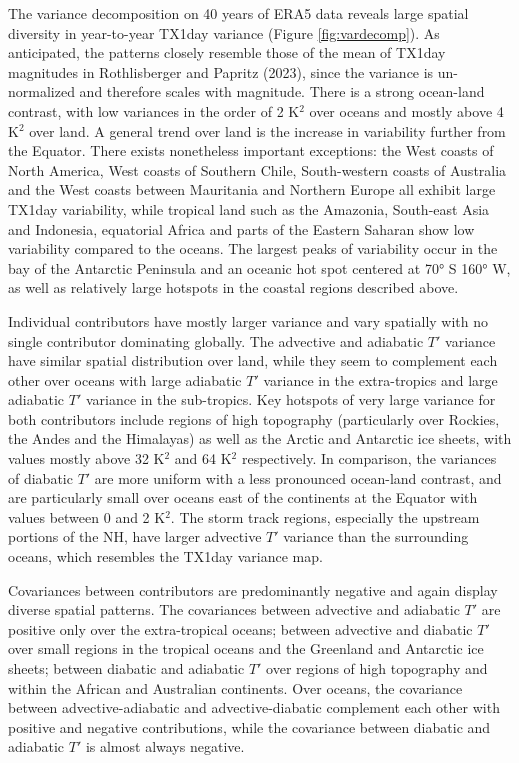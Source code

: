 \documentclass[11pt,a4paper,twoside,openright]{report}
\theoremstyle{definition}
\begin{document}
The variance decomposition on 40 years of ERA5 data reveals large spatial diversity in year-to-year TX1day variance (Figure \ref{fig:vardecomp}). As anticipated, the patterns closely resemble those of the mean of TX1day magnitudes in Rothlisberger and Papritz (2023), since the variance is un-normalized and therefore scales with magnitude. There is a strong ocean-land contrast, with low variances in the order of 2 K\(^2\) over oceans and mostly above 4 K\(^2\) over land. A general trend over land is the increase in variability further from the Equator. There exists nonetheless important exceptions: the West coasts of North America, West coasts of Southern Chile, South-western coasts of Australia and the West coasts between Mauritania and Northern Europe all exhibit large TX1day variability, while tropical land such as the Amazonia, South-east Asia and Indonesia, equatorial Africa and parts of the Eastern Saharan show low variability compared to the oceans. The largest peaks of variability occur in the bay of the Antarctic Peninsula and an oceanic hot spot centered at 70° S 160° W, as well as relatively large hotspots in the coastal regions described above.

Individual contributors have mostly larger variance and vary spatially with no single contributor dominating globally. The advective and adiabatic \(T'\) variance have similar spatial distribution over land, while they seem to complement each other over oceans with large adiabatic \(T'\) variance in the extra-tropics and large adiabatic \(T'\) variance in the sub-tropics. Key hotspots of very large variance for both contributors include regions of high topography (particularly over Rockies, the Andes and the Himalayas) as well as the Arctic and Antarctic ice sheets, with values mostly above 32 K\(^2\) and 64 K\(^2\) respectively. In comparison, the variances of diabatic \(T'\) are more uniform with a less pronounced ocean-land contrast, and are particularly small over oceans east of the continents at the Equator with values between 0 and 2 K\(^2\). The storm track regions, especially the upstream portions of the NH, have larger advective \(T'\) variance than the surrounding oceans, which resembles the TX1day variance map.

Covariances between contributors are predominantly negative and again display diverse spatial patterns. The covariances between advective and adiabatic \(T'\) are positive only over the extra-tropical oceans; between advective and diabatic \(T'\) over small regions in the tropical oceans and the Greenland and Antarctic ice sheets; between diabatic and adiabatic \(T'\) over regions of high topography and within the African and Australian continents. Over oceans, the covariance between advective-adiabatic and advective-diabatic complement each other with positive and negative contributions, while the covariance between diabatic and adiabatic \(T'\) is almost always negative.
\end{document}
